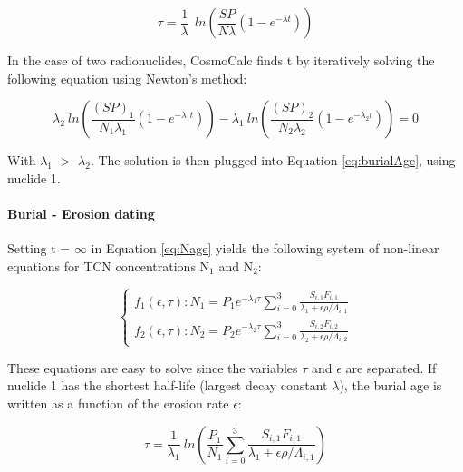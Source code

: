 \documentclass{article}
\begin{document}
\begin{equation}
  \label{eq:burialAge}
  \tau = \frac{1}{\lambda} ~~ln\left( \frac{SP}{N\lambda}\left( 1 - e^{-\lambda t}\right) \right)
\end{equation}

In the  case of  two radionuclides, CosmoCalc  finds t  by iteratively
solving the following equation using Newton's method:

\begin{equation}
  \label{eq:solving_t}
  \lambda_2 ~ln\left( \frac{(SP)_1}{N_1\lambda_1}\left( 1 - e^{-\lambda_1 t}\right) \right) -
  \lambda_1 ~ln\left( \frac{(SP)_2}{N_2\lambda_2}\left( 1 - e^{-\lambda_2 t}\right) \right) = 0
\end{equation}

With $\lambda_1$  $>$ $\lambda_2$. The  solution is then  plugged into
Equation \ref{eq:burialAge}, using nuclide 1.

\paragraph{Burial - Erosion dating\\}

Setting t  = $\infty$ in  Equation \ref{eq:Nage} yields  the following
system of non-linear equations for TCN concentrations N$_1$ and N$_2$:

\begin{equation}
\label{eq:burialSystem}
\left\{
\begin{array}{l}
f_1(\epsilon,\tau): N_1 = P_1 e^{- \lambda_1 \tau} \sum_{i=0}^3 
   \frac{S_{i,1} F_{i,1}}{\lambda_1 + \epsilon \rho / \Lambda_{i,1}}\\
f_2(\epsilon,\tau): N_2 = P_2 e^{- \lambda_2 \tau} \sum_{i=0}^3 
   \frac{S_{i,2} F_{i,2}}{\lambda_2 + \epsilon \rho / \Lambda_{i,2}}
\end{array}\right.
\end{equation}

These  equations are  easy to  solve  since the  variables $\tau$  and
$\epsilon$  are separated.  If  nuclide 1  has the  shortest half-life
(largest decay  constant $\lambda$),  the burial age  is written  as a
function of the erosion rate $\epsilon$:

\begin{equation}
  \label{eq:tau}
  \tau = \frac{1}{\lambda_1} ~ln\left(\frac{P_1}{N_1}
  \sum_{i=0}^3 \frac{S_{i,1} F_{i,1}}{\lambda_1 + \epsilon \rho / \Lambda_{i,1}}\right)
\end{equation}
\end{document}
